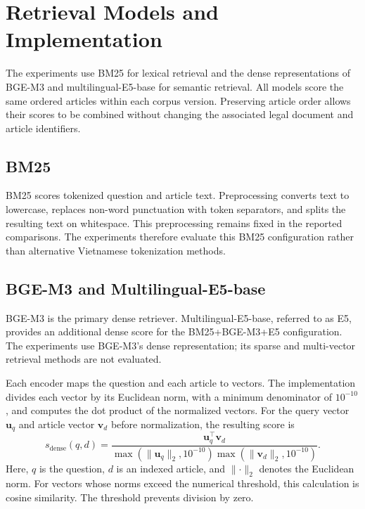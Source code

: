 \section{Retrieval Models and Implementation}
\label{sec:retrieval-implementation}

The experiments use BM25 for lexical retrieval and the dense representations of BGE-M3 and multilingual-E5-base for semantic retrieval. All models score the same ordered articles within each corpus version. Preserving article order allows their scores to be combined without changing the associated legal document and article identifiers.

\subsection{BM25}

BM25 scores tokenized question and article text. Preprocessing converts text to lowercase, replaces non-word punctuation with token separators, and splits the resulting text on whitespace. This preprocessing remains fixed in the reported comparisons. The experiments therefore evaluate this BM25 configuration rather than alternative Vietnamese tokenization methods.

\subsection{BGE-M3 and Multilingual-E5-base}

BGE-M3 is the primary dense retriever. Multilingual-E5-base, referred to as E5, provides an additional dense score for the BM25+BGE-M3+E5 configuration. The experiments use BGE-M3's dense representation; its sparse and multi-vector retrieval methods are not evaluated.

Each encoder maps the question and each article to vectors. The implementation divides each vector by its Euclidean norm, with a minimum denominator of \(10^{-10}\), and computes the dot product of the normalized vectors. For the query vector \(\mathbf{u}_q\) and article vector \(\mathbf{v}_d\) before normalization, the resulting score is
\[
s_{\mathrm{dense}}(q,d)=\frac{\mathbf{u}_q^\top\mathbf{v}_d}{\max(\lVert\mathbf{u}_q\rVert_2,10^{-10})\max(\lVert\mathbf{v}_d\rVert_2,10^{-10})}.
\]
Here, \(q\) is the question, \(d\) is an indexed article, and \(\lVert\cdot\rVert_2\) denotes the Euclidean norm. For vectors whose norms exceed the numerical threshold, this calculation is cosine similarity. The threshold prevents division by zero.


